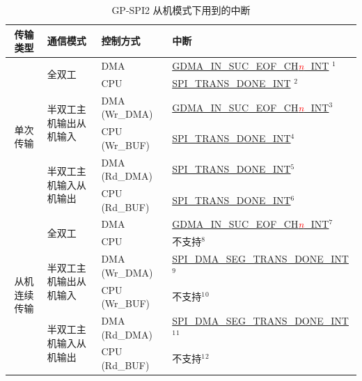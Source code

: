\documentclass[main\_\_CN.tex]{subfiles}
\begin{document}
\begin{longtable}[c]{|c|l|l|l|}
\caption{GP-SPI2 从机模式下用到的中断}\label{tab:spi-gp-spi2-slave-interrupts}
\\
\hline

\rowcolor{lightgray}
传输类型  & 通信模式 & 控制方式 & 中断 \\ \hline
\endhead
\multirow{6}{*}{单次传输} & \multirow{2}{*}{全双工} & DMA & \hyperref[int:GDMAINSUCEOFINT]{GDMA\_IN\_SUC\_EOF\_CH\textcolor{red}{\it{n}}\_INT} \hyperref[other:spi-item-gp-spi2-slave-interrupts-note-1]{$^1$} \\ \cline{3-4}
&& CPU & \hyperref[int:SPITRANSDONEINT]{SPI\_TRANS\_DONE\_INT} \hyperref[other:spi-item-gp-spi2-slave-interrupts-note-2]{$^2$}  \\ \cline{2-4}
& \multirow{2}{*}{半双工主机输出从机输入} & DMA (Wr\_DMA) & \hyperref[int:GDMAINSUCEOFINT]{GDMA\_IN\_SUC\_EOF\_CH\textcolor{red}{\it{n}}\_INT}\hyperref[other:spi-item-gp-spi2-slave-interrupts-note-3]{$^3$}\\ \cline{3-4}
&& CPU (Wr\_BUF) & \hyperref[int:SPITRANSDONEINT]{SPI\_TRANS\_DONE\_INT}\hyperref[other:spi-item-gp-spi2-slave-interrupts-note-4]{$^4$}  \\ \cline{2-4}
& \multirow{2}{*}{半双工主机输入从机输出} & DMA (Rd\_DMA) & \hyperref[int:SPITRANSDONEINT]{SPI\_TRANS\_DONE\_INT}\hyperref[other:spi-item-gp-spi2-slave-interrupts-note-5]{$^5$} \\ \cline{3-4}
&& CPU (Rd\_BUF) & \hyperref[int:SPITRANSDONEINT]{SPI\_TRANS\_DONE\_INT}\hyperref[other:spi-item-gp-spi2-slave-interrupts-note-6]{$^6$} \\ \hline
\multirow{6}{*}{从机连续传输} & \multirow{2}{*}{全双工} & DMA & \hyperref[int:GDMAINSUCEOFINT]{GDMA\_IN\_SUC\_EOF\_CH\textcolor{red}{\it{n}}\_INT}\hyperref[other:spi-item-gp-spi2-slave-interrupts-note-7]{$^7$} \\ \cline{3-4}
&& CPU & 不支持\hyperref[other:spi-item-gp-spi2-slave-interrupts-note-8]{$^8$} \\ \cline{2-4}
& \multirow{2}{*}{半双工主机输出从机输入} & DMA (Wr\_DMA)  & \hyperref[int:SPIDMASEGTRANSDONEINT]{SPI\_DMA\_SEG\_TRANS\_DONE\_INT}\hyperref[other:spi-item-gp-spi2-slave-interrupts-note-9]{$^9$} \\ \cline{3-4}
&& CPU (Wr\_BUF)           & 不支持\hyperref[other:spi-item-gp-spi2-slave-interrupts-note-10]{$^1$$^0$}       \\ \cline{2-4}
& \multirow{2}{*}{半双工主机输入从机输出} & DMA (Rd\_DMA) & \hyperref[int:SPIDMASEGTRANSDONEINT]{SPI\_DMA\_SEG\_TRANS\_DONE\_INT}\hyperref[other:spi-item-gp-spi2-slave-interrupts-note-11]{$^1$$^1$} \\ \cline{3-4}
&& CPU (Rd\_BUF) & 不支持\hyperref[other:spi-item-gp-spi2-slave-interrupts-note-12]{$^1$$^2$}       \\ \hline

\end{longtable}
\end{document}
